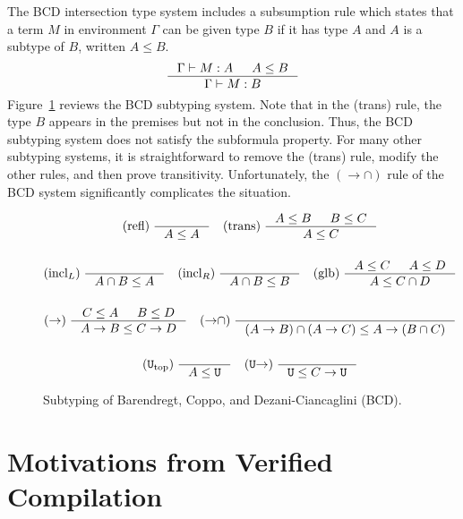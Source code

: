 \documentclass{article}
\begin{document}
The BCD intersection type system includes a subsumption rule which
states that a term $M$ in environment $\Gamma$ can be given type $B$
if it has type $A$ and $A$ is a subtype of $B$, written $A \leq B$.
\[
\inference{\Gamma \vdash M : A & A \leq B}
          {\Gamma \vdash M : B}
\]
Figure~\ref{fig:BCD-subtyping} reviews the BCD subtyping system.  Note
that in the (trans) rule, the type $B$ appears in the premises but not
in the conclusion. Thus, the BCD subtyping system does not satisfy the
subformula property.  For many other subtyping systems, it is
straightforward to remove the (trans) rule, modify the other rules,
and then prove transitivity.  Unfortunately, the $({\to}{\cap})$ rule
of the BCD system significantly complicates the situation.

\begin{figure}[tbp]
  \begin{gather*}
    \text{(refl)} \; \inference{}{A \leq A} \quad
    \text{(trans)} \; \inference{A \leq B & B \leq C}{A \leq C} \\[3ex]
    \text{(incl$_L$)} \; \inference{}{A \cap B \leq A} \quad
    \text{(incl$_R$)} \; \inference{}{A \cap B \leq B} \quad
    \text{(glb)} \; \inference{A \leq C & A \leq D}{A \leq C \cap D} \\[3ex]
    (\to) \; \inference{C \leq A & B \leq D}{A \to B \leq C \to D} \quad
    ({\to}{\cap}) \; \inference{}{(A \to B) \cap (A \to C) \leq A \to (B \cap C)} \\[3ex]
    (\TOP_{\mathrm{top}}) \; \inference{}{A \leq \TOP} \quad
    (\TOP{\to}) \; \inference{}{\TOP \leq C \to \TOP}
  \end{gather*}
  \caption{Subtyping of Barendregt, Coppo, and
    Dezani-Ciancaglini (BCD).}
  \label{fig:BCD-subtyping}
\end{figure}

\section{Motivations from Verified Compilation}
\label{sec:motivation}
\end{document}

